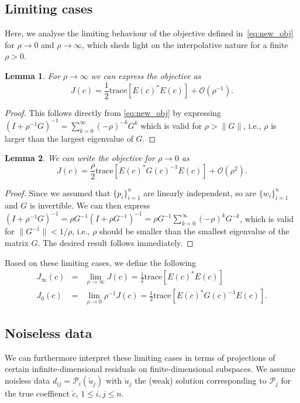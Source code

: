 \documentclass[12pt]{amsart}
\newtheorem{lma}{Lemma}
\begin{document}
\subsection{Limiting cases}
Here, we analyse the limiting behaviour of the objective defined in~\eqref{eq:new_obj} for $\rho\rightarrow 0$ and $\rho \rightarrow \infty$, which sheds light on the interpolative nature for a finite $\rho >0$. 
\begin{lma}
For $\rho \rightarrow \infty$ we can express the objective as
\[
J(c) =  {\textstyle\frac{1}{2}}\text{trace}\left[E(c)^*E(c)\right] + \mathcal{O}(\rho^{-1}).
\]
\end{lma}
\begin{proof}
This follows directly from \eqref{eq:new_obj} by expressing $(I + \rho^{-1}G)^{-1} = \sum_{k=0}^\infty (-\rho)^{-k}G^k$ which is valid for $\rho > \|G\|$, i.e., $\rho$ is larger than the largest eigenvalue of $G$.
\end{proof}
\begin{lma}
\label{lma:rho_zero}
We can write the objective for $\rho \rightarrow 0$ as
\[
J(c) = {\textstyle\frac{\rho}{2}}\text{trace}\left[E(c)^*G(c)^{-1}E(c)\right] + \mathcal{O}(\rho^2).
\]
\end{lma}
\begin{proof}
Since we assumed that $\{p_i\}_{i=1}^n$ are linearly independent, so are $\{w_i\}_{i=1}^n$ and $G$ is invertible. We can then express $(I + \rho^{-1}G)^{-1}=\rho G^{-1}(I + \rho G^{-1})^{-1} = \rho G^{-1}\sum_{k=0}^{\infty} (-\rho)^k G^{-k}$, which is valid for $ \|G^{-1}\| < 1/\rho$, i.e., $\rho$ should be smaller than the smallest eigenvalue of the matrix $G$. The desired result follows immediately.
\end{proof}
Based on these limiting cases, we define the following
\begin{eqnarray}
J_\infty(c) &=& \lim_{\rho\rightarrow \infty} J(c) ={\textstyle\frac{1}{2}}\text{trace}\left[E(c)^*E(c)\right]    \label{eq:Jinfty}\\
J_0(c) &=& \lim_{\rho\rightarrow 0} \rho^{-1}J(c) =  {\textstyle\frac{1}{2}}\text{trace}\left[E(c)^*G(c)^{-1}E(c)\right].\label{eq:J0}
\end{eqnarray}

\subsection{Noiseless data}
We can furthermore interpret these limiting cases in terms of projections of certain infinite-dimensional residuals on finite-dimensional subspaces. We assume noisless data $d_{ij} = \mathcal{P}_i(\check{u}_j)$ with $\check{u}_j$ the (weak) solution corresponding to $\mathcal{P}_j$ for the true coeffienct $\check{c}$, $1\leq i,j \leq n$.
\end{document}
